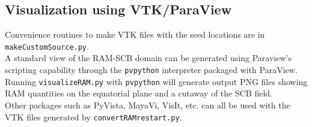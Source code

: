 \subsection{Visualization using VTK/ParaView}
Convenience routines to make VTK files with the seed locations are in {\tt makeCustomSource.py}.\\
A standard view of the RAM-SCB domain can be generated using Paraview's scripting capability through the {\tt pvpython} interpreter packaged with ParaView. Running {\tt visualizeRAM.py} with {\tt pvpython} will generate output PNG files showing RAM quantities on the equatorial plane and a cutaway of the SCB field.\\
Other packages such as PyVista, MayaVi, VisIt, etc. can all be used with the VTK files generated by {\tt convertRAMrestart.py}.
